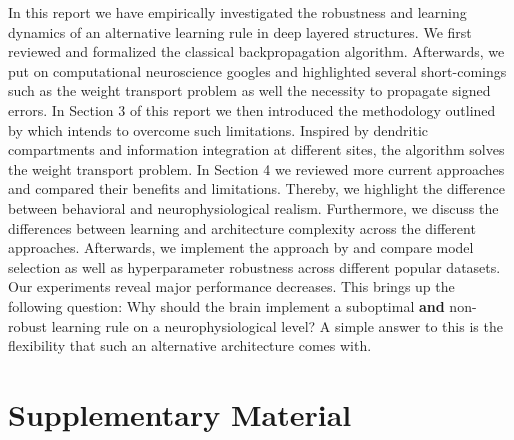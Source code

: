 \documentclass[colorinlistoftodos]{article}
\theoremstyle{definition}
\begin{document}
In this report we have empirically investigated the robustness and learning dynamics of an alternative learning rule in deep layered structures.
We first reviewed and formalized the classical backpropagation algorithm. Afterwards, we put on computational neuroscience googles and highlighted several short-comings such as the weight transport problem as well the necessity to propagate signed errors.
In Section 3 of this report we then introduced the methodology outlined by \citet{guerguiev2017} which intends to overcome such limitations. Inspired by dendritic compartments and information integration at different sites, the algorithm solves the weight transport problem.
In Section 4 we reviewed more current approaches and compared their benefits and limitations. Thereby, we highlight the difference between behavioral and neurophysiological realism. Furthermore, we discuss the differences between learning and architecture complexity across the different approaches. 
Afterwards, we implement the approach by \citet{guerguiev2017} and compare model selection as well as hyperparameter robustness across different popular datasets. Our experiments reveal major performance decreases. This brings up the following question: Why should the brain implement a suboptimal \textbf{and} non-robust learning rule on a neurophysiological level? A simple answer to this is the flexibility that such an alternative architecture comes with.



\setlength{\bibsep}{4pt plus 0.3ex}

{\footnotesize }

\newpage
\section*{Supplementary Material}


\end{document}

